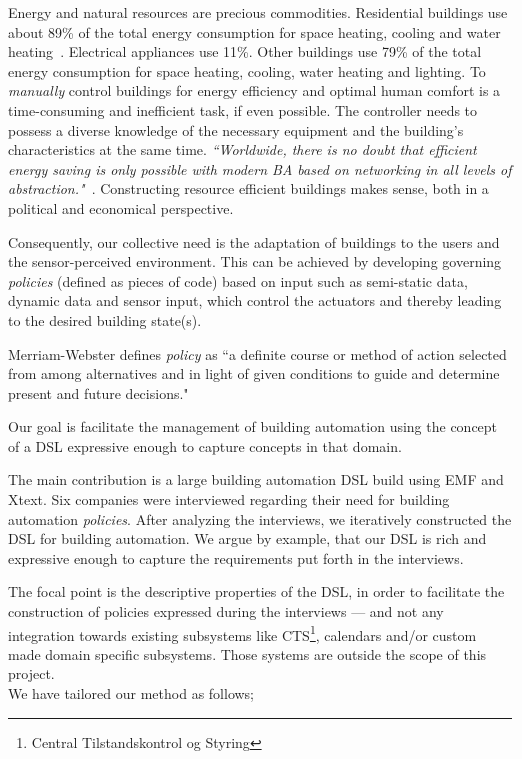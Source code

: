 Energy and natural resources are precious commodities. Residential buildings use about 89\% of the total energy consumption for space heating, cooling and water heating~\cite{janssen2004towards}. Electrical appliances use 11\%. Other buildings use 79\% of the total energy consumption for space heating, cooling, water heating and lighting. To \textit{manually} control buildings for energy efficiency and optimal human comfort is a time-consuming and inefficient task, if even possible. The controller needs to possess a diverse knowledge of the necessary equipment and the building's characteristics at the same time. \textit{``Worldwide, there is no doubt that efficient energy saving is only possible with modern BA based on networking in all levels of abstraction."}~\cite{dietrich2010communication}. Constructing resource efficient buildings makes sense, both in a political and economical perspective. 

Consequently, our collective need is the adaptation of buildings to the users and the sensor-perceived environment. This can be achieved by developing governing \textit{policies} (defined as pieces of code) based on input such as semi-static data, dynamic data and sensor input, which control the actuators and thereby leading to the desired building state(s).

Merriam-Webster defines \textit{policy} as ``a definite course or method of action selected from among alternatives and in light of given conditions to guide and determine present and future decisions."

Our goal is facilitate the management of building automation using the concept of a DSL expressive enough to capture concepts in that domain.

The main contribution is a large building automation DSL build using EMF and Xtext. Six companies were interviewed regarding their need for building automation \textit{policies}. After analyzing the interviews, we iteratively constructed the DSL for building automation. We argue by example, that our DSL is rich and expressive enough to capture the requirements put forth in the interviews. 

The focal point is the descriptive properties of the DSL, in order to facilitate the construction of policies expressed during the interviews --- and not any integration towards existing subsystems like CTS\footnote{Central Tilstandskontrol og Styring}, calendars and/or custom made domain specific subsystems. Those systems are outside the scope of this project.
\newline\\
We have tailored our method as follows;

